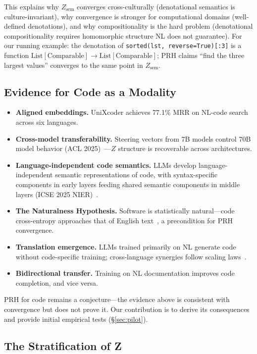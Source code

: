 \documentclass[11pt]{article}
\theoremstyle{definition}
\newcommand{\Zsem}{Z_{\text{sem}}}
\begin{document}
This explains why $\Zsem$ converges cross-culturally (denotational semantics is culture-invariant), why convergence is stronger for computational domains (well-defined denotations), and why compositionality is the hard problem (denotational compositionality requires homomorphic structure NL does not guarantee). For our running example: the denotation of \texttt{sorted(lst, reverse=True)[:3]} is a function $\text{List}[\text{Comparable}] \to \text{List}[\text{Comparable}]$; PRH claims ``find the three largest values'' converges to the same point in $\Zsem$.

\subsection{Evidence for Code as a Modality}\label{sec:evidence}

\begin{itemize}[nosep]
  \item \textbf{Aligned embeddings.} UniXcoder achieves 77.1\% MRR on NL-code search across six languages.
  \item \textbf{Cross-model transferability.} Steering vectors from 7B models control 70B model behavior (ACL 2025)~\cite{chen2025crossmodel}---$Z$ structure is recoverable across architectures.
  \item \textbf{Language-independent code semantics.} LLMs develop language-independent semantic representations of code, with syntax-specific components in early layers feeding shared semantic components in middle layers (ICSE 2025 NIER)~\cite{beyondsyntax2025}.
  \item \textbf{The Naturalness Hypothesis.} Software is statistically natural---code cross-entropy approaches that of English text~\cite{hindle2012naturalness}, a precondition for PRH convergence.
  \item \textbf{Translation emergence.} LLMs trained primarily on NL generate code without code-specific training; cross-language synergies follow scaling laws~\cite{cassano2025scaling}.
  \item \textbf{Bidirectional transfer.} Training on NL documentation improves code completion, and vice versa.
\end{itemize}

PRH for code remains a conjecture---the evidence above is consistent with convergence but does not prove it. Our contribution is to derive its consequences and provide initial empirical tests (\S\ref{sec:pilot}).

\subsection{The Stratification of Z}\label{sec:stratification}
\end{document}

